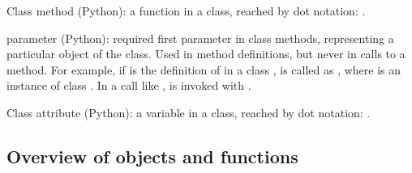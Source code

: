 \begin{trivlist}
  \item[Class method (Python):] a function in a class, reached by dot
  notation: .

  \item[\emp{self} parameter (Python):] required first parameter in class
  methods, representing a particular object of the class. Used
  in method definitions, but never in calls to a method.  For example,
  if  is the definition of  in a class
  ,  is called as , where 
  is an instance of class .  In a call like ,
   is invoked with .

  \item[Class attribute (Python):] a variable in a class, reached by
  dot notation: .
\end{trivlist}

\subsection{Overview of objects and functions}


